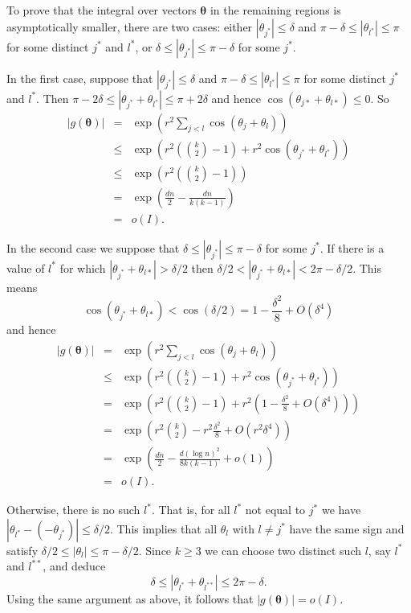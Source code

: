 \documentclass[12pt]{article}
\begin{document}
To prove that the integral over vectors $\mathbf{\theta}$ in the 
remaining regions is asymptotically
smaller, there are two cases: either $|\theta_{j^*}| \leq \delta $ and
$\pi - \delta \leq |\theta_{l^*}| \leq \pi$ for some distinct $j^*$ and $l^*$, or
$\delta \leq |\theta_{j^*}| \leq \pi - \delta$ for some $j^*$.

In the first case, suppose that $|\theta_{j^*}| \leq \delta $ and
$\pi - \delta \leq |\theta_{l^*}| \leq \pi$ for some distinct $j^*$ and $l^*$. Then
$\pi - 2\delta \leq |\theta_{j^*} + \theta_{l^*}| \leq \pi + 2\delta$
and hence $\cos( \theta_{j*} + \theta_{l*} ) \leq 0$.
So
\begin{eqnarray*}
  |g(\mathbf{\theta})|
&=&
\exp \left( r^2 \sum_{j<l} \cos( \theta_j + \theta_l )  \right)
\\
&\leq&
\exp \left(  r^2 ( \binom{k}{2} - 1 ) + r^2 \cos( \theta_{j^*} + \theta_{l^*} )
\right)
\\
&\leq&
\exp \left( r^2 ( \binom{k}{2} - 1 )  \right)
\\
&=&
\exp \left( \frac{dn}{2} - \frac{dn}{k(k-1)} \right)
\\
&=&
o(I).
\end{eqnarray*}

In the second case we suppose that
$\delta \leq |\theta_{j^*}| \leq \pi - \delta$ for some $j^*$.
If there is a value of $l^*$ for which $|\theta_{j^*} + 
\theta_{l*}| > \delta / 2$ then
$\delta/2 < |\theta_{j^*} + \theta_{l*}| < 2\pi - \delta / 2$. This means
$$
\cos(\theta_{j^*} + \theta_{l*}) < \cos( \delta / 2 )
= 1 - \frac{\delta^2}{8} + O(\delta^4)
$$
and hence
\begin{eqnarray*}
|g(\mathbf{\theta})|
&=&
\exp\left( r^2 \sum_{j<l} \cos( \theta_j + \theta_l ) \right)
\\
&\leq&
  \exp\left( r^2 ( \binom{k}{2} - 1 ) + r^2 \cos( \theta_{j^*} + 
\theta_{l^*} ) \right)
\\
&=&
  \exp\left( r^2 ( \binom{k}{2} - 1 ) + r^2 ( 1 - \frac{\delta^2}{8} + 
O(\delta^4) ) \right)
\\
&=&
  \exp\left( r^2  \binom{k}{2}  - r^2\frac{\delta^2}{8} + 
O(r^2\delta^4)  \right)
\\
&=&
  \exp\left( \frac{dn}{2} - \frac{d(\log n)^2}{8k(k-1)} + o(1) \right)
\\
&=&
o(I).
\end{eqnarray*}

Otherwise, there is no such $l^*$. That is, for all $l^*$ not equal to
$j^*$ we have $|\theta_{l^*} - (-\theta_{j^*})| \leq \delta/2$. This implies
that all $\theta_l$ with $l \not = j^*$ have the same sign and satisfy
$\delta/2  \leq |\theta_{l}| \leq \pi - \delta/2$. Since $k\geq 3$ we can
choose two distinct such $l$, say $l^*$ and $l^{**}$, and deduce
$$
\delta \leq |\theta_{l^*} + \theta_{l^{**}}| \leq 2\pi - \delta.
$$
Using the same argument as above, it follows that
$|g(\mathbf{\theta})| =  o(I)$.
\end{document}
